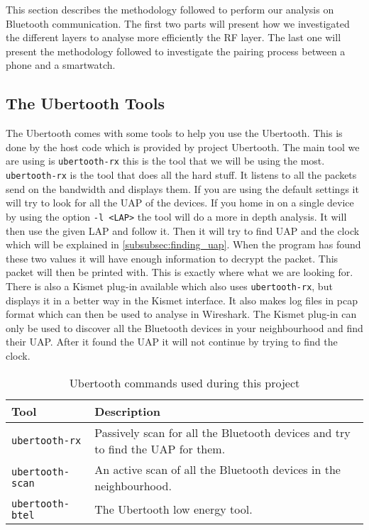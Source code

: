 This section describes the methodology followed to perform our analysis on Bluetooth communication. The first two parts will present how we investigated the different layers to analyse more efficiently the RF layer. The last one will present the methodology followed to investigate the pairing process between a phone and a smartwatch.


\subsection{The Ubertooth Tools}
\label{subsubsec:ubertooth_tools}
The Ubertooth comes with some tools to help you use the Ubertooth. This is done by the host code which is provided by project Ubertooth. 
The main tool we are using is \verb|ubertooth-rx|  this is the tool that we will be using the most. \verb|ubertooth-rx| is the tool that does all the hard stuff. It listens to all the packets send on the bandwidth and displays them. If you are using the default settings it will try to look for all the UAP of the devices. If you home in on a single device by using the option \verb|-l <LAP>| the tool will do a more in depth analysis. It will then use the given LAP and follow it. Then it will try to find UAP and the clock which will be explained in \ref{subsubsec:finding_uap}. When the program has found these two values it will have enough information to decrypt the packet. This packet will then be printed with. This is exactly where what we are looking for. \pend There is also a Kismet plug-in available which also uses \verb|ubertooth-rx|, but displays it in a better way in the Kismet interface. It also makes log files in pcap format which can then be used to analyse in Wireshark. The Kismet plug-in can only be used to discover all the Bluetooth devices in your neighbourhood and find their UAP. After it found the UAP it will not continue by trying to find the clock.

\begin{table}[!h]
\begin{tabular}{|l|l|}
\hline
Tool & Description \\
\hline
\verb|ubertooth-rx| & Passively scan for all the Bluetooth devices and try to find the UAP for them. \\
\hline
\verb|ubertooth-scan| & An active scan of all the Bluetooth devices in the neighbourhood.  \\
\hline
\verb|ubertooth-btel| & The Ubertooth low energy tool. \\
\hline
\end{tabular}
\caption{Ubertooth commands used during this project}
\label{tab:ubertooth_tools}
\end{table}
